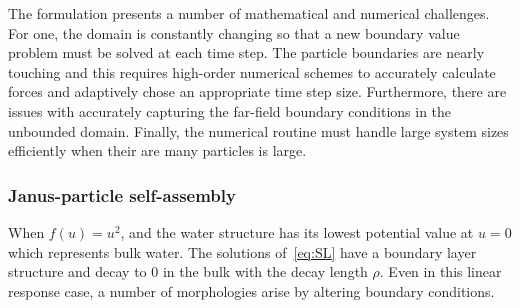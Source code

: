 
The formulation presents a number of mathematical and numerical
challenges. For one, the domain is constantly changing so that a new
boundary value problem must be solved at each time step.  The particle
boundaries are nearly touching and this requires high-order numerical
schemes to accurately calculate forces and adaptively chose an
appropriate time step size. Furthermore, there are issues with
accurately capturing the far-field boundary conditions in the unbounded
domain. Finally, the numerical routine must handle large system sizes
efficiently when their are many particles is large. 


\subsubsection{Janus-particle self-assembly} 
When $f(u) = u^2$, and the water structure has its lowest potential
value at $u=0$ which represents bulk water. The solutions
of~\eqref{eq:SL} have a boundary layer structure and decay to $0$ in the
bulk with the decay length $\rho$. Even in this linear response case, a
number of morphologies arise by altering boundary conditions.

